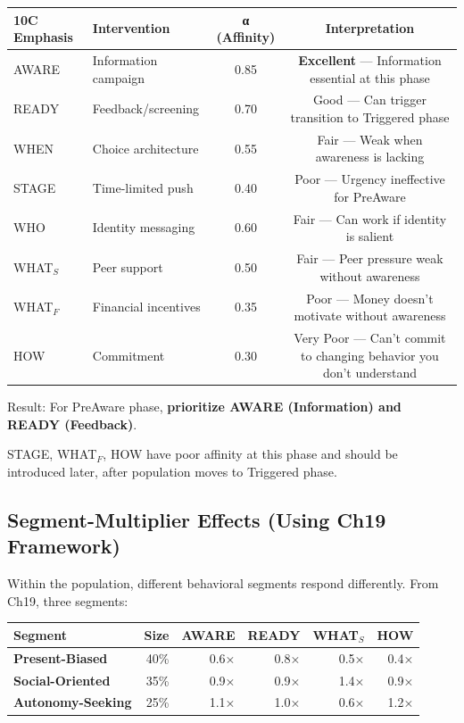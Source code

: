 \begin{center}
\begin{tabular}{@{}llcc@{}}
\toprule
\textbf{10C Emphasis} & \textbf{Intervention} & \textbf{α (Affinity)} & \textbf{Interpretation} \\
\midrule
AWARE & Information campaign & 0.85 & \textbf{Excellent} --- Information essential at this phase \\
READY & Feedback/screening & 0.70 & Good --- Can trigger transition to Triggered phase \\
WHEN & Choice architecture & 0.55 & Fair --- Weak when awareness is lacking \\
STAGE & Time-limited push & 0.40 & Poor --- Urgency ineffective for PreAware \\
WHO & Identity messaging & 0.60 & Fair --- Can work if identity is salient \\
WHAT$_S$ & Peer support & 0.50 & Fair --- Peer pressure weak without awareness \\
WHAT$_F$ & Financial incentives & 0.35 & Poor --- Money doesn't motivate without awareness \\
HOW & Commitment & 0.30 & Very Poor --- Can't commit to changing behavior you don't understand \\
\midrule
\end{tabular}
\end{center}

Result: For PreAware phase, \textbf{prioritize AWARE (Information) and READY (Feedback)}.

STAGE, WHAT$_F$, HOW have poor affinity at this phase and should be introduced later, after population moves to Triggered phase.

\subsection{Segment-Multiplier Effects (Using Ch19 Framework)}

Within the population, different behavioral segments respond differently. From Ch19, three segments:

\begin{center}
\begin{tabular}{@{}lrrrrr@{}}
\toprule
\textbf{Segment} & \textbf{Size} & \textbf{AWARE} & \textbf{READY} & \textbf{WHAT$_S$} & \textbf{HOW} \\
\midrule
\textbf{Present-Biased} & 40\% & 0.6× & 0.8× & 0.5× & 0.4× \\
\textbf{Social-Oriented} & 35\% & 0.9× & 0.9× & 1.4× & 0.9× \\
\textbf{Autonomy-Seeking} & 25\% & 1.1× & 1.0× & 0.6× & 1.2× \\
\midrule
\end{tabular}
\end{center}

